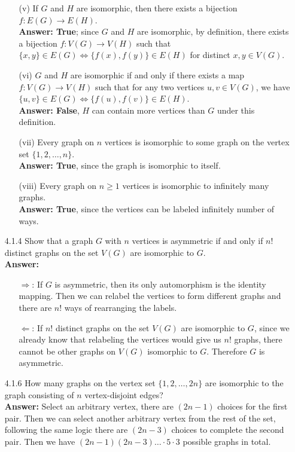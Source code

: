 \documentclass{article}
\begin{document}
\begin{itemize}
\begin{itemize}
              \item [(v)] If $G$ and $H$ are isomorphic, then there exists a bijection $f:E(G)\rightarrow E(H)$.\\\textbf{Answer: True}; since $G$ and $H$ are isomorphic, by definition, there exists a bijection $f:V(G)\rightarrow V(H)$ such that $\{x,y\}\in E(G)\Leftrightarrow\{f(x),f(y)\}\in E(H)$ for distinct $x,y\in V(G)$.
              \item [(vi)] $G$ and $H$ are isomorphic if and only if there exists a map $f:V(G)\rightarrow V(H)$ such that for any two vertices $u,v\in V(G)$, we have $\{u,v\}\in E(G)\Leftrightarrow\{f(u),f(v)\}\in E(H)$.\\\textbf{Answer: False}, $H$ can contain more vertices than $G$ under this definition.
              \item [(vii)] Every graph on $n$ vertices is isomorphic to some graph on the vertex set $\{1,2,\ldots,n\}$.\\\textbf{Answer: True}, since the graph is isomorphic to itself.
              \item [(viii)] Every graph on $n\geq 1$ vertices is isomorphic to infinitely many graphs.\\\textbf{Answer: True}, since the vertices can be labeled infinitely number of ways.
          \end{itemize}
    \item [4.1.4] Show that a graph $G$ with $n$ vertices is asymmetric if and only if $n!$ distinct graphs on the set $V(G)$ are isomorphic to $G$.\\\textbf{Answer: }\begin{itemize}
              \item [$\Rightarrow$: ] If $G$ is asymmetric, then its only automorphism is the identity mapping. Then we can relabel the vertices to form different graphs and there are $n!$ ways of rearranging the labels.
              \item [$\Leftarrow$: ] If $n!$ distinct graphs on the set $V(G)$ are isomorphic to $G$, since we already know that relabeling the vertices would give us $n!$ graphs, there cannot be other graphs on $V(G)$ isomorphic to $G$. Therefore $G$ is asymmetric.
          \end{itemize}
    \item [4.1.6] How many graphs on the vertex set $\{1,2,\ldots,2n\}$ are isomorphic to the graph consisting of $n$ vertex-disjoint edges?\\\textbf{Answer: } Select an arbitrary vertex, there are $(2n-1)$ choices for the first pair. Then we can select another arbitrary vertex from the rest of the set, following the same logic there are $(2n-3)$ choices to complete the second pair. Then we have $(2n-1)(2n-3)\ldots\cdot 5\cdot 3$ possible graphs in total.

\end{itemize}
\end{document}
